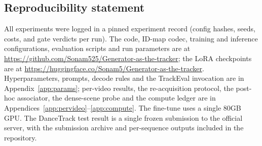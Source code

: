 \documentclass{article} %
\begin{document}
\subsection*{Reproducibility statement}
All experiments were logged in a pinned experiment record (config hashes, seeds, costs,
and gate verdicts per run). The code, ID-map codec, training and inference configurations,
evaluation scripts and run parameters are at \url{https://github.com/Sonam525/Generator-as-the-tracker}; the LoRA checkpoints
are at \url{https://huggingface.co/Sonam5/Generator-as-the-tracker}. Hyperparameters, prompts, decode rules and the
TrackEval invocation are in Appendix~\ref{app:params}; per-video results, the
re-acquisition protocol, the post-hoc associator, the dense-scene probe and the compute
ledger are in Appendices~\ref{app:pervideo}--\ref{app:compute}. The fine-tune uses a single
80GB GPU. The DanceTrack test result is a single frozen submission to the official server,
with the submission archive and per-sequence outputs included in the repository.




\appendix
\end{document}

